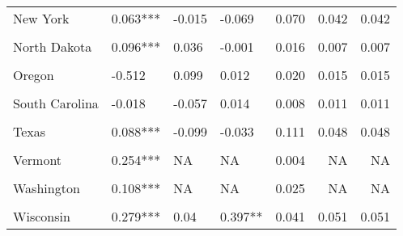\begin{table}[!h]
\begin{tabular}[t]{llllrrr}
New York & 0.063*** & -0.015 & -0.069 & 0.070 & 0.042 & 0.042\\
\cellcolor{gray!10}{North Carolina} & \cellcolor{gray!10}{0.05} & \cellcolor{gray!10}{-0.064} & \cellcolor{gray!10}{0.143} & \cellcolor{gray!10}{0.012} & \cellcolor{gray!10}{0.015} & \cellcolor{gray!10}{0.015}\\
North Dakota & 0.096*** & 0.036 & -0.001 & 0.016 & 0.007 & 0.007\\
\cellcolor{gray!10}{Ohio} & \cellcolor{gray!10}{0.017} & \cellcolor{gray!10}{-0.028} & \cellcolor{gray!10}{0.03} & \cellcolor{gray!10}{0.072} & \cellcolor{gray!10}{0.063} & \cellcolor{gray!10}{0.063}\\
Oregon & -0.512 & 0.099 & 0.012 & 0.020 & 0.015 & 0.015\\
\cellcolor{gray!10}{Pennsylvania} & \cellcolor{gray!10}{-0.028} & \cellcolor{gray!10}{-0.075} & \cellcolor{gray!10}{-0.097*} & \cellcolor{gray!10}{0.055} & \cellcolor{gray!10}{0.065} & \cellcolor{gray!10}{0.065}\\
South Carolina & -0.018 & -0.057 & 0.014 & 0.008 & 0.011 & 0.011\\
\cellcolor{gray!10}{South Dakota} & \cellcolor{gray!10}{0.065***} & \cellcolor{gray!10}{-0.209*} & \cellcolor{gray!10}{-0.071} & \cellcolor{gray!10}{0.017} & \cellcolor{gray!10}{0.012} & \cellcolor{gray!10}{0.012}\\
Texas & 0.088*** & -0.099 & -0.033 & 0.111 & 0.048 & 0.048\\
\cellcolor{gray!10}{Utah} & \cellcolor{gray!10}{0.114} & \cellcolor{gray!10}{0.289} & \cellcolor{gray!10}{0.483} & \cellcolor{gray!10}{0.004} & \cellcolor{gray!10}{0.004} & \cellcolor{gray!10}{0.004}\\
Vermont & 0.254*** & NA & NA & 0.004 & NA & NA\\
\cellcolor{gray!10}{Virginia} & \cellcolor{gray!10}{0.083***} & \cellcolor{gray!10}{NA} & \cellcolor{gray!10}{NA} & \cellcolor{gray!10}{0.015} & \cellcolor{gray!10}{NA} & \cellcolor{gray!10}{NA}\\
Washington & 0.108*** & NA & NA & 0.025 & NA & NA\\
\cellcolor{gray!10}{West Virginia} & \cellcolor{gray!10}{0.127**} & \cellcolor{gray!10}{0.152} & \cellcolor{gray!10}{-0.033} & \cellcolor{gray!10}{0.006} & \cellcolor{gray!10}{0.005} & \cellcolor{gray!10}{0.005}\\
Wisconsin & 0.279*** & 0.04 & 0.397** & 0.041 & 0.051 & 0.051\\
\bottomrule
\end{tabular}
\end{table}
